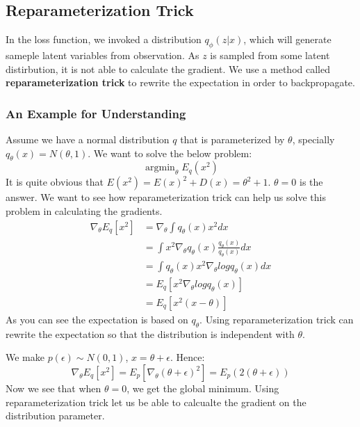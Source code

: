 \documentclass{article}
\begin{document}
\subsection{Reparameterization Trick}
In the loss function, we invoked a distribution $q_{\phi}(z|x)$, which will generate sameple latent variables from observation. As $z$ is sampled from some latent distirbution, it is not able to calculate the gradient. We use a method called \textbf{reparameterization trick} to rewrite the expectation in order to backpropagate.

\subsubsection{An Example for Understanding} 
Assume we have a normal distribution $q$ that is parameterized by $\theta$, specially $q_{\theta}(x)=N(\theta,1)$. We want to solve the below problem:
$$\mathop{\arg\min}_{\theta} E_{q}(x^{2})$$
It is quite obvious that $E(x^{2})=E(x)^{2}+D(x)=\theta^{2}+1$. $\theta=0$ is the answer. We want to see how reparameterization trick can help us solve this problem in calculating the gradients. 
\begin{align*}
\nabla_{\theta}E_{q}[x^{2}]&=\nabla_{\theta} \int q_{\theta}(x)x^{2}dx \\
&=  \int x^{2} \nabla_{\theta}q_{\theta}(x) \frac{q_{\theta}(x)}{q_{\theta}(x)} dx \\
&= \int q_{\theta}(x) x^{2} \nabla_{\theta} log q_{\theta}(x) dx \\
&= E_{q}[x^{2}\nabla_{\theta} logq_{\theta}(x)] \\
&= E_{q}[x^{2}(x-\theta)]
\end{align*}
As you can see the expectation is based on $q_{\theta}$. Using reparameterization trick can rewrite the expectation so that the distribution is independent with $\theta$. 

We make $p(\epsilon) \sim N (0,1)$, $x=\theta+\epsilon$. Hence: 
$$\nabla_{\theta}E_{q}[x^{2}]=E_{p}[\nabla_{\theta}(\theta+\epsilon)^{2}]=E_{p}(2(\theta+\epsilon))$$
Now we see that when $\theta=0$, we get the global minimum. Using reparameterization trick let us be able to calcualte the gradient on the distribution parameter.
\end{document}
